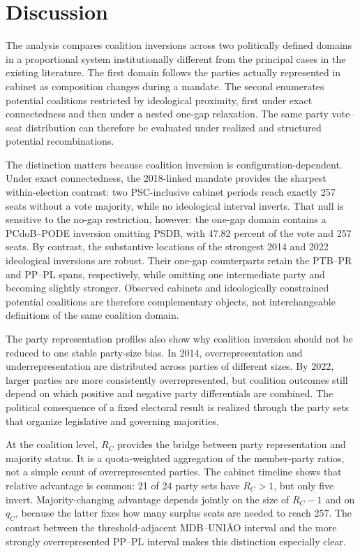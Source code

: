 \documentclass[11pt]{article}
\begin{document}
\section{Discussion}
\label{sec:disc}

The analysis compares coalition inversions across two politically defined
domains in a proportional system institutionally different from the principal
cases in the existing literature. The first domain follows the parties actually
represented in cabinet as composition changes during a mandate. The second
enumerates potential coalitions restricted by ideological proximity, first
under exact connectedness and then under a nested one-gap relaxation. The same
party vote--seat distribution can therefore be evaluated under realized and
structured potential recombinations.

The distinction matters because coalition inversion is
configuration-dependent. Under exact connectedness, the 2018-linked mandate
provides the sharpest within-election contrast: two PSC-inclusive cabinet
periods reach exactly 257 seats without a vote majority, while no ideological
interval inverts. That null is sensitive to the no-gap restriction, however:
the one-gap domain contains a PCdoB--PODE inversion omitting PSDB, with 47.82
percent of the vote and 257 seats. By contrast, the substantive locations of
the strongest 2014 and 2022 ideological inversions are robust. Their one-gap
counterparts retain the PTB--PR and PP--PL spans, respectively, while omitting
one intermediate party and becoming slightly stronger. Observed cabinets and
ideologically constrained potential coalitions are therefore complementary
objects, not interchangeable definitions of the same coalition domain.

The party representation profiles also show why coalition inversion should not
be reduced to one stable party-size bias. In 2014, overrepresentation and
underrepresentation are distributed across parties of different sizes. By 2022,
larger parties are more consistently overrepresented, but coalition outcomes
still depend on which positive and negative party differentials are combined.
The political consequence of a fixed electoral result is realized through the
party sets that organize legislative and governing majorities.

At the coalition level, \(R_C\) provides the bridge between party
representation and majority status. It is a quota-weighted aggregation of the
member-party ratios, not a simple count of overrepresented parties. The cabinet
timeline shows that relative advantage is common: 21 of 24 party sets have
\(R_C>1\), but only five invert. Majority-changing advantage depends jointly
on the size of \(R_C-1\) and on \(q_C\), because the latter fixes how many
surplus seats are needed to reach 257. The contrast between the
threshold-adjacent MDB--UNIÃO interval and the more strongly overrepresented
PP--PL interval makes this distinction especially clear.
\end{document}
